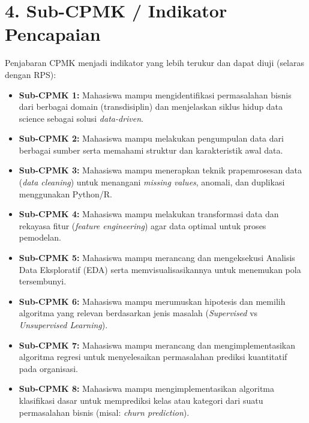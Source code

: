 \documentclass[12pt,a4paper]{article}
\begin{document}
\section*{4. Sub-CPMK / Indikator Pencapaian}

Penjabaran CPMK menjadi indikator yang lebih terukur dan dapat diuji (selaras dengan RPS):

\begin{itemize}[leftmargin=*]
  \item \textbf{Sub-CPMK 1:} Mahasiswa mampu mengidentifikasi permasalahan bisnis dari berbagai domain (transdisiplin) dan menjelaskan siklus hidup data science sebagai solusi \textit{data-driven}.

  \item \textbf{Sub-CPMK 2:} Mahasiswa mampu melakukan pengumpulan data dari berbagai sumber serta memahami struktur dan karakteristik awal data.

  \item \textbf{Sub-CPMK 3:} Mahasiswa mampu menerapkan teknik prapemrosesan data (\textit{data cleaning}) untuk menangani \textit{missing values}, anomali, dan duplikasi menggunakan Python/R.

  \item \textbf{Sub-CPMK 4:} Mahasiswa mampu melakukan transformasi data dan rekayasa fitur (\textit{feature engineering}) agar data optimal untuk proses pemodelan.

  \item \textbf{Sub-CPMK 5:} Mahasiswa mampu merancang dan mengeksekusi Analisis Data Eksploratif (EDA) serta memvisualisasikannya untuk menemukan pola tersembunyi.

  \item \textbf{Sub-CPMK 6:} Mahasiswa mampu merumuskan hipotesis dan memilih algoritma yang relevan berdasarkan jenis masalah (\textit{Supervised} vs \textit{Unsupervised Learning}).

  \item \textbf{Sub-CPMK 7:} Mahasiswa mampu merancang dan mengimplementasikan algoritma regresi untuk menyelesaikan permasalahan prediksi kuantitatif pada organisasi.

  \item \textbf{Sub-CPMK 8:} Mahasiswa mampu mengimplementasikan algoritma klasifikasi dasar untuk memprediksi kelas atau kategori dari suatu permasalahan bisnis (misal: \textit{churn prediction}).


\end{itemize}
\end{document}
